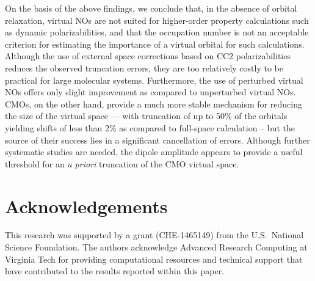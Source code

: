 \documentclass[journal=jpccck,manuscript=article]{achemso}
\begin{document}
On the basis of the above findings, we conclude that, in the absence of
orbital relaxation, virtual NOs are not
suited for higher-order property calculations such as dynamic
polarizabilities, and that the occupation number is not an acceptable
criterion for estimating the importance of a virtual orbital for such
calculations.  Although the use of external space corrections based on CC2
polarizabilities reduces the observed truncation errors, they are too
relatively costly to be practical for large molecular systems.  Furthermore,
the use of perturbed virtual NOs offers only slight improvement as compared to
unperturbed virtual NOs.  CMOs, on the other hand, provide a much more stable
mechanism for reducing the size of the virtual space --- with truncation of up
to 50\% of the orbitals yielding shifts of less than 2\% as compared to
full-space calculation -- but the source of their success lies in a
significant cancellation of errors.  Although further systematic studies are
needed, the dipole amplitude appears to provide a useful threshold for an {\em
a priori} truncation of the CMO virtual space.

\section{Acknowledgements}

This research was supported by a grant (CHE-1465149) from the U.S.\
National Science Foundation. The authors acknowledge Advanced Research
Computing at Virginia Tech for providing computational resources and
technical support that have contributed to the results reported within this
paper.

\clearpage
%


\newpage


\end{document}
